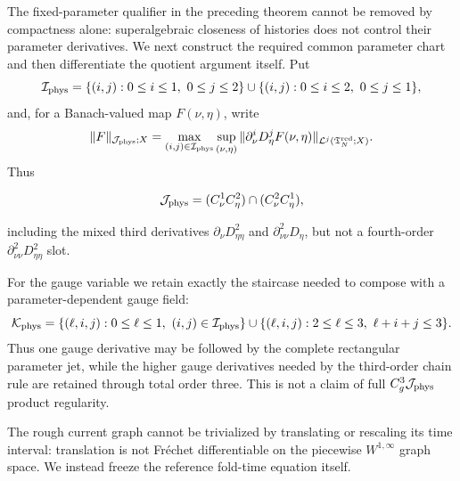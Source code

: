 The fixed-parameter qualifier in the preceding theorem cannot be removed by
compactness alone: superalgebraic closeness of histories does not control
their parameter derivatives.  We next construct the required common
parameter chart and then differentiate the quotient argument itself.  Put
\begin{equation}
 \mathcal I_{\rm phys}
 =\{(i,j):0\le i\le1,\ 0\le j\le2\}
   \cup\{(i,j):0\le i\le2,\ 0\le j\le1\},       \label{eq:physical-rectangular-index-set}
\end{equation}
and, for a Banach-valued map $F(\nu,\eta)$, write
\begin{equation}
 \|F\|_{\mathcal J_{\rm phys};X}
 =\max_{(i,j)\in\mathcal I_{\rm phys}}
   \sup_{(\nu,\eta)}
   \|\partial_\nu^iD_\eta^jF(\nu,\eta)\|_{
      \mathcal L^j(\mathfrak T_N^{\rm red};X)}.   \label{eq:physical-rectangular-jet-norm}
\end{equation}
Thus

\[
 \mathcal J_{\rm phys}
 =(C_\nu^1C_\eta^2)\cap(C_\nu^2C_\eta^1),
\]

including the mixed third derivatives
$\partial_\nu D_{\eta\eta}^2$ and
$\partial_{\nu\nu}^2D_\eta$, but not a fourth-order
$\partial_{\nu\nu}^2D_{\eta\eta}^2$ slot.

For the gauge variable we retain exactly the staircase needed to compose
with a parameter-dependent gauge field:
\begin{equation}
 \mathcal K_{\rm phys}
 =\{(\ell,i,j):0\le\ell\le1,
                  \ (i,j)\in\mathcal I_{\rm phys}\}
  \cup\{(\ell,i,j):2\le\ell\le3,
                  \ \ell+i+j\le3\}.             \label{eq:physical-gauge-staircase}
\end{equation}
Thus one gauge derivative may be followed by the complete rectangular
parameter jet, while the higher gauge derivatives needed by the
third-order chain rule are retained through total order three.  This is
not a claim of full $C_g^3\mathcal J_{\rm phys}$ product regularity.

The rough current graph cannot be trivialized by translating or rescaling
its time interval: translation is not Fr\'{e}chet differentiable on the
piecewise $W^{1,\infty}$ graph space.  We instead freeze the reference
fold-time equation itself.

